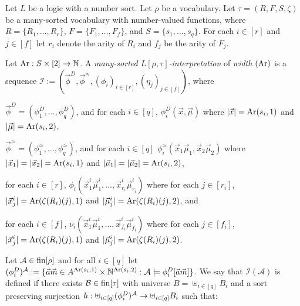 \documentclass[../main/thesis.tex]{subfiles}
\begin{document}
\begin{definition}
  Let $L$ be a logic with a number sort. Let $\rho$ be a vocabulary. Let $\tau =
  (R, F, S, \zeta)$ be a many-sorted vocabulary with number-valued functions,
  where $R = \{R_1, \ldots, R_{r}\}$, $F = \{ F_1, \ldots, F_{f} \}$, and $S =
  \{s_1, \ldots, s_{q}\}$. For each $i \in [r]$ and $j \in [f]$ let $r_i$ denote
  the arity of $R_i$ and $f_j$ be the arity of $F_j$.

  Let $\text{\upshape Ar} : S \times [2] \rightarrow \mathbb{N}$. A \emph{many-sorted $L [\rho,
    \tau]$-interpretation} of \emph{width} $(\text{\upshape Ar})$ is a sequence $\mathcal{I} :=
  (\vec{\phi}^D, \vec{\phi}^{\approx}, (\phi_i)_{i \in [r]}, (\eta_j)_{j \in
    [f]})$, where

  \begin{myenum}
  \item $\vec{\phi}^D = (\phi^D_1, \ldots, \phi^D_q)$, and for each $i \in [q]$,
    $\phi^D_i(\vec{x}, \vec{\mu})$ where $\vert \vec{x} \vert = \text{\upshape Ar}(s_i, 1)$ and
    $\vert \vec{\mu} \vert = \text{\upshape Ar}(s_i, 2)$,
  \item $\vec{\phi}^{\approx} = (\phi^{\approx}_1, \ldots, \phi^{\approx}_q)$,
    and for each $i \in [q]$ $\phi^{\approx}_i(\vec{x}_1\vec{\mu}_1, \vec{x}_2
    \vec{\mu}_2)$ where $\vert \vec{x}_1 \vert = \vert \vec{x}_2 \vert =
    \text{\upshape Ar}(s_i, 1)$ and $\vert \vec{\mu}_1 \vert = \vert \vec{\mu}_2 \vert =
    \text{\upshape Ar}(s_i, 2)$,
  \item for each $i \in [r]$, $\phi_i (\vec{x}^i_1 \vec{\mu}^i_1, \ldots,
    \vec{x}^{i}_{r_i} \vec{\mu}^{i}_{r_i})$ where for each $j \in [r_i]$, $\vert
    \vec{x}^i_j\vert = \text{\upshape Ar}(\zeta(R_i)(j), 1)$ and $\vert \vec{\mu}^i_j \vert =
    \text{\upshape Ar}(\zeta(R_i)(j), 2)$, and
  \item for each $i \in [f]$, $\nu_i (\vec{x}^i_1 \vec{\mu}^i_1, \ldots,
    \vec{x}^{i}_{f_i} \vec{\mu}^{i}_{f_i})$ where for each $j \in [f_i]$, $\vert
    \vec{x}^i_j \vert = \text{\upshape Ar}(\zeta(R_i)(j), 1)$ and $\vert \vec{\mu}^i_j \vert =
    \text{\upshape Ar}(\zeta(R_i)(j), 2)$.
  \end{myenum}

  Let $\mathcal{A} \in \text{\upshape fin}[\rho]$ and for all $i \in [q]$ let
  $(\phi^D_i)^{\mathcal{A}} := \{ \vec{a}\vec{m} \in A^{\text{\upshape Ar}(s_i, 1)} \times
  \mathbb{N}^{\text{\upshape Ar}(s_i, 2)}: \mathcal{A} \models \phi^D_i[\vec{a}\vec{m}] \}$. We say
  that $\mathcal{I} (\mathcal{A})$ is defined if there exists $\mathcal{B} \in
  \text{\upshape fin}[\tau]$ with universe $B = \uplus_{i \in [q]} B_i$ and a sort preserving
  surjection $h : \uplus_{i \in [q]} (\phi^D_i)^{\mathcal{A}} \rightarrow \uplus_{i \in
    [q]} B_i$ such that:
    

\end{definition}
\end{document}
